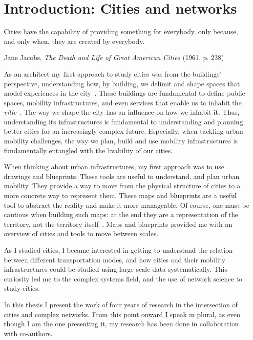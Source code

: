 \chapter{Introduction: Cities and networks}

\epigraph{Cities have the capability of providing something for everybody, only because, and only when, they are created by everybody.}{Jane Jacobs, \textit{The Death and Life of Great American Cities} (1961, p. 238)}

As an architect my first approach to study cities was from the buildings' perspective, understanding how, by building, we delimit and shape spaces that model experiences in the city~\cite{gehl1971life}. These buildings are fundamental to define public spaces, mobility infrastructures, and even services that enable us to inhabit the \textit{ville}~\cite{sennett2018building}. The way we shape the city has an influence on how we inhabit it. Thus, understanding its infrastructures is fundamental to understanding and planning better cities for an increasingly complex future. Especially, when tackling urban mobility challenges, the way we plan, build and use mobility infrastructures is fundamentally entangled with the livability of our cities.

When thinking about urban infrastructures, my first approach was to use drawings and blueprints. These tools are useful to understand, and plan urban mobility. They provide a way to move from the physical structure of cities to a more concrete way to represent them. These maps and blueprints are a useful tool to abstract the reality and make it more manageable. Of course, one must be cautious when building such maps: at the end they are a representation of the territory, not the territory itself~\cite{borges1961hacedor}. Maps and blueprints provided me with an overview of cities and tools to move between scales.

As I studied cities, I became interested in getting to understand the relation between different transportation modes, and how cities and their mobility infrastructures could be studied using large scale data systematically. This curiosity led me to the complex systems field, and the use of network science to study cities. 

In this thesis I present the work of four years of research in the intersection of cities and complex networks. From this point onward I speak in plural, as even though I am the one presenting it, my research has been done in collaboration with co-authors. 

